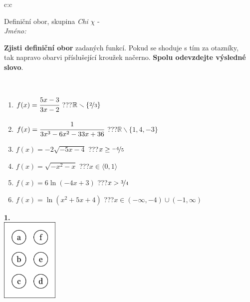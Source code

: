\documentclass[10pt]{report}
\begin{document}
\begin{tabular}{c:c}
\begin{minipage}[c][104.5mm][t]{0.5\linewidth}
\begin{center}
\vspace{7mm}
{\huge Definiční obor, skupina \textit{Chi $\chi$} -}\\[5mm]
\textit{Jméno:}\phantom{xxxxxxxxxxxxxxxxxxxxxxxxxxxxxxxxxxxxxxxxxxxxxxxxxxxxxxxxxxxxxxxxx}\\[5mm]
\begin{minipage}{0.95\linewidth}
\begin{center}
\textbf{Zjisti definiční obor} zadaných funkcí. Pokud se shoduje s tím za otazníky,\\tak napravo obarvi příslušející kroužek načerno. \textbf{Spolu odevzdejte výsledné slovo}.
\end{center}
\end{minipage}
\\[1mm]
\begin{minipage}{0.79\linewidth}
\begin{center}
\begin{varwidth}{\linewidth}
\begin{enumerate}
\normalsizerrr
\item $f(x)=\cfrac{5x-3}{3x-2}$\quad \dotfill\; ???\;\dotfill \quad $\mathbb{R}\smallsetminus\{\nicefrac{2}{3}\}$
\item $f(x)=\cfrac{1}{3x^3-6x^2-33x+36}$\quad \dotfill\; ???\;\dotfill \quad $\mathbb{R}\smallsetminus\{1,4,-3\}$
\item $f(x)=-2\sqrt{-5x-4}$\quad \dotfill\; ???\;\dotfill \quad $x\geq\nicefrac{-4}{5}$
\item $f(x)=\sqrt{-x^2-x}$\quad \dotfill\; ???\;\dotfill \quad $x\in\langle0 , 1\rangle$
\item $f(x)=6\ln{(-4x+3)}$\quad \dotfill\; ???\;\dotfill \quad $x>\nicefrac{3}{4}$
\item $f(x)=\ln{(x^2+5x+4)}$\quad \dotfill\; ???\;\dotfill \quad $x\in(-\infty , -4)\cup(-1 , \infty)$
\end{enumerate}
\end{varwidth}
\end{center}
\end{minipage}
\begin{minipage}{0.20\linewidth}
\begin{center}
{\Huge\bfseries 1.} \\[2mm]
\includegraphics[height=40mm]{../images/braille.png}

\end{center}
\end{minipage}
\end{center}
\end{minipage}
\end{tabular}
\end{document}
